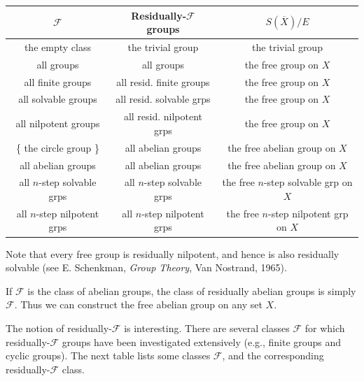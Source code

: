 \documentclass{article}
\begin{document}
\begin{center} 
\begin{tabular}{|c|c|c|}
\hline
$\mathcal{F}$                               & Residually-$\mathcal{F}$ groups             & $S(\overline{X})/E$ \\
\hline
{\footnotesize the empty class}             & {\footnotesize the trivial group}           & {\footnotesize the trivial group} \\
{\footnotesize all groups}                  & {\footnotesize all groups}                  & {\footnotesize the free group on $X$} \\
{\footnotesize all finite groups}           & {\footnotesize all resid. finite groups}    & {\footnotesize the free group on $X$} \\
{\footnotesize all solvable groups}         & {\footnotesize all resid. solvable grps}    & {\footnotesize the free group on $X$} \\
{\footnotesize all nilpotent groups}        & {\footnotesize all resid. nilpotent grps}   & {\footnotesize the free group on $X$} \\
{\footnotesize \{ the circle group \} }     & {\footnotesize all abelian groups}          & {\footnotesize the free abelian group on $X$} \\
{\footnotesize all abelian groups}          & {\footnotesize all abelian groups}          & {\footnotesize the free abelian group on $X$} \\
{\footnotesize all $n$-step solvable grps}  & {\footnotesize all $n$-step solvable grps}  & {\footnotesize the free $n$-step solvable grp on $X$} \\
{\footnotesize all $n$-step nilpotent grps} & {\footnotesize all $n$-step nilpotent grps} & {\footnotesize the free $n$-step nilpotent grp on $X$} \\
\hline
\end{tabular} 
\end{center}
\vspace{0.3cm}

Note that every free group is residually nilpotent, and hence is also residually solvable (see E. Schenkman, \emph{Group Theory}, Van Nostrand, 1965).

If $\mathcal{F}$ is the class of abelian groups, the class of residually abelian groups is simply $\mathcal{F}$. Thus we can construct the free abelian group on any set $X$.

The notion of residually-$\mathcal{F}$ is interesting. There are several classes $\mathcal{F}$ for which residually-$\mathcal{F}$ groups have been investigated extensively (e.g., finite groups and cyclic groups). The next table lists some classes $\mathcal{F}$, and the corresponding residually-$\mathcal{F}$ class.
\end{document}
